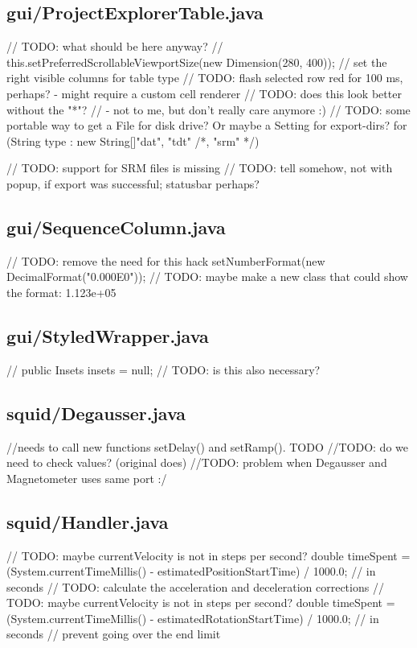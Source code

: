 \subsection{gui/ProjectExplorerTable.java}
        // TODO: what should be here anyway?
        // this.setPreferredScrollableViewportSize(new Dimension(280, 400));
        // set the right visible columns for table type
                    // TODO: flash selected row red for 100 ms, perhaps? - might require a custom cell renderer
            // TODO: does this look better without the "*"?
            // - not to me, but don't really care anymore :)
            // TODO: some portable way to get a File for disk drive? Or maybe a Setting for export-dirs?
                for (String type : new String[]{"dat", "tdt" /*, "srm" */}) {   // TODO: support for SRM files is missing
                                // TODO: tell somehow, not with popup, if export was successful; statusbar perhaps?

\subsection{gui/SequenceColumn.java}
        // TODO: remove the need for this hack
            setNumberFormat(new DecimalFormat("0.000E0"));  // TODO: maybe make a new class that could show the format: 1.123e+05

\subsection{gui/StyledWrapper.java}
//        public Insets insets = null; // TODO: is this also necessary?

\subsection{squid/Degausser.java}
        //needs to call new functions setDelay() and setRamp(). TODO
        //TODO: do we need to check values? (original does)
        //TODO: problem when Degausser and Magnetometer uses same port :/

\subsection{squid/Handler.java}
        // TODO: maybe currentVelocity is not in steps per second?
        double timeSpent = (System.currentTimeMillis() - estimatedPositionStartTime) / 1000.0;    // in seconds
        // TODO: calculate the acceleration and deceleration corrections
        // TODO: maybe currentVelocity is not in steps per second?
        double timeSpent = (System.currentTimeMillis() - estimatedRotationStartTime) / 1000.0;    // in seconds
        // prevent going over the end limit

}
